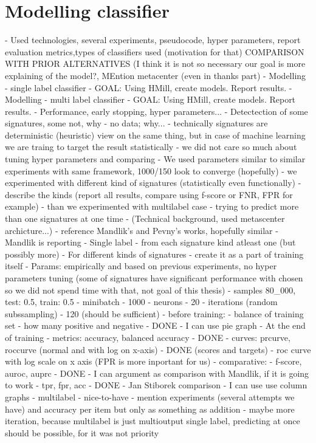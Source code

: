 \chapter{Modelling classifier}

- Used technologies, several experiments, pseudocode, hyper parameters, report evaluation metrics,types of classifiers used (motivation for that) COMPARISON WITH PRIOR ALTERNATIVES (I think it is not so necessary our goal is more explaining of the model?, MEntion metacenter (even in thanks part)
  - Modelling - single label classifier
    - GOAL: Using HMill, create models. Report results.
  - Modelling - multi label classifier
    - GOAL: Using HMill, create models. Report results.
  - Performance, early stopping, hyper parameters...
  - Detectection of some signatures, some not, why - no data; why...
    - technically signatures are deterministic (heuristic) view on the same thing, but in case of machine learning we are traing to target the result statistically
    - we did not care so much about tuning hyper parameters and comparing
       - We used parameters similar to similar experiments with same framework, 1000/150 look to converge (hopefully)
       - we experimented with different kind of signatures (statistically even functionally) - describe the kinds (report all results, compare using f-score or FNR, FPR for example)
       - than we experimented with multilabel case - trying to predict more than one signatures at one time
  - (Technical background, used metascenter archicture...)
  - reference Mandlik's and Pevny's works, hopefully similar
    - Mandlik is reporting
      - Single label - from each signature kind atleast one (but possibly more) - For different kinds of signatures - create it as a part of training itself
        - Params: empirically and based on previous experiments, no hyper parameters tuning (some of signatures have significant performance with chosen so we did not spend time with that, not goal of this thesis)
            - samples 80_000, test: 0.5, train: 0.5
            - minibatch - 1000
            - neurons - 20
            - iterations (random subssampling) - 120 (should be sufficient)
        - before training:
            - balance of training set - how many positive and negative - DONE
                - I can use pie graph
        - At the end of training
            - metrics: accuracy, balanced accuracy - DONE
            - curves: prcurve, roccurve (normal and with log on x-axis) - DONE (scores and targets)
                - roc curve with log scale on x axis (FPR is more inportant for us)
            - comparative: 
                - f-score, auroc, auprc - DONE
                    - I can argument as comparison with Mandlik, if it is going to work
                - tpr, fpr, acc - DONE
                    - Jan Stiborek comparison
                    - I can use use column graphs
        - multilabel - nice-to-have
            - mention experiments (several attempts we have) and accuracy per item but only as something as addition - maybe more iteration, because multilabel is just multioutput single label, predicting at once should be possible, for it was not priority
        
      